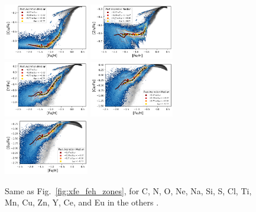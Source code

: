 \documentclass[fleqn,usenatbib]{mnras}
\begin{document}
\begin{figure}
    \includegraphics[width=0.33\textwidth]{figures/xfe_feh_zones_Cu.png}
    \includegraphics[width=0.33\textwidth]{figures/xfe_feh_zones_Zn.png}
    \includegraphics[width=0.33\textwidth]{figures/xfe_feh_zones_Y.png}
    \includegraphics[width=0.33\textwidth]{figures/xfe_feh_zones_Ce.png}
    \includegraphics[width=0.33\textwidth]{figures/xfe_feh_zones_Eu.png}
    \caption{Same as Fig.~\ref{fig:xfe_feh_zones}, for C, N, O, Ne, Na, Si, S, Cl, Ti, Mn, Cu, Zn, Y, Ce, and Eu in the others \href{https://github.com/svenbuder/gse_nihaouhd/tree/main/figures}{\faGithub}.}
    \label{fig:additional_xfe_feh_zones}
\end{figure}
\end{document}
